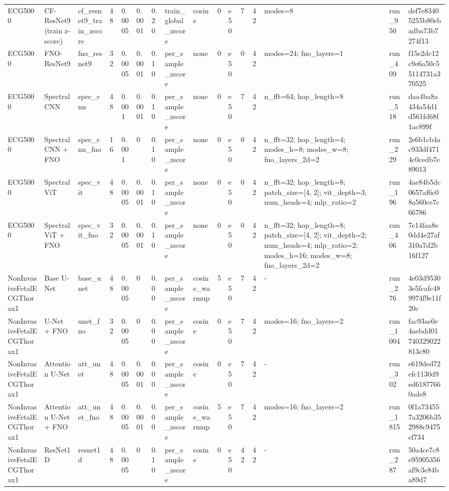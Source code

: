\begin{longtable}{llllllllllllllll}
ECG5000 & CF-ResNet9 (train z-score) & cf\_resnet9\_train\_zscore & 48 & 0.0005 & 0.0001 & 0.20 & train\_global\_zscore & cosine & 0 & e50 & 7 & 42 & modes=8 & run\_950 & def7e83405255b80ebadba73b7274f13 \\
ECG5000 & FNO-ResNet9 & fno\_resnet9 & 32 & 0.0005 & 0.0001 & 0.10 & per\_sample\_zscore & none & 0 & e50 & 0 & 42 & modes=24; fno\_layers=1 & run\_409 & f15e2dc12c9e6a50c55114731a370525 \\
ECG5000 & Spectral CNN & spec\_cnn & 48 & 0.001 & 0.0001 & 0.10 & per\_sample\_zscore & none & 0 & e50 & 7 & 42 & n\_fft=64; hop\_length=8 & run\_518 & daa4ba8a434a54d1d561fd68f1ac899f \\
ECG5000 & Spectral CNN + FNO & spec\_cnn\_fno & 16 & 0.001 & 0 & 0.10 & per\_sample\_zscore & none & 0 & e50 & 0 & 42 & n\_fft=32; hop\_length=4; modes\_h=8; modes\_w=8; fno\_layers\_2d=2 & run\_229 & 2e6b1cb4ac933df4714c0cedb7e89013 \\
ECG5000 & Spectral ViT & spec\_vit & 48 & 0.0005 & 0.0001 & 0.10 & per\_sample\_zscore & none & 0 & e50 & 0 & 42 & n\_fft=32; hop\_length=8; patch\_size=[4, 2]; vit\_depth=3; num\_heads=4; mlp\_ratio=2 & run\_196 & 4ae84b5dc0657af6c08a560ce7c66786 \\
ECG5000 & Spectral ViT + FNO & spec\_vit\_fno & 32 & 0.0005 & 0.0001 & 0.10 & per\_sample\_zscore & none & 0 & e50 & 0 & 42 & n\_fft=32; hop\_length=8; patch\_size=[4, 2]; vit\_depth=2; num\_heads=4; mlp\_ratio=2; modes\_h=16; modes\_w=8; fno\_layers\_2d=2 & run\_406 & 7e14faa8e0dd4e27af310a7d2b16f127 \\
NonInvasiveFetalECGThorax1 & Base U-Net & base\_unet & 48 & 0.0005 & 0 & 0.00 & per\_sample\_zscore & cosine\_warmup & 5 & e50 & 7 & 42 & - & run\_276 & 4e03d95303e5fcafc489974f9e11f20c \\
NonInvasiveFetalECGThorax1 & U-Net + FNO & unet\_fno & 32 & 0.0005 & 0 & 0.00 & per\_sample\_zscore & cosine & 0 & e50 & 7 & 42 & modes=16; fno\_layers=2 & run\_1004 & fac93ae0e4aebdd01740329022813c80 \\
NonInvasiveFetalECGThorax1 & Attention U-Net & att\_unet & 48 & 0.0005 & 0.0001 & 0.00 & per\_sample\_zscore & cosine & 0 & e50 & 7 & 42 & - & run\_302 & e619ded72efc1130d9ed61877660ade8 \\
NonInvasiveFetalECGThorax1 & Attention U-Net + FNO & att\_unet\_fno & 48 & 0.0005 & 0.0001 & 0.00 & per\_sample\_zscore & cosine\_warmup & 5 & e50 & 7 & 42 & modes=16; fno\_layers=2 & run\_1815 & 0f1a734557a3206b352988c9475cf734 \\
NonInvasiveFetalECGThorax1 & ResNet1D & resnet1d & 48 & 0.0005 & 0 & 0.10 & per\_sample\_zscore & cosine & 0 & e50 & 42 & 42 & - & run\_287 & 50a4ce7c8e95905356af9c3e84ba89d7 \\

\end{longtable}
